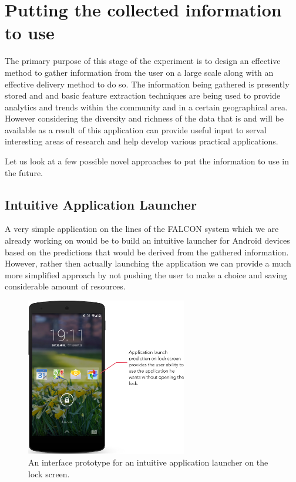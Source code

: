 \documentclass[12pt]{report}
\begin{document}
\begin{itemize}
\end{itemize}



\chapter{Putting the collected information to use}
\label{futureUser}
The primary purpose of this stage of the experiment is to design an effective method to gather information from the user on a large scale along with an effective delivery method to do so. The information being gathered is presently stored and and basic feature extraction techniques are being used to provide analytics and trends within the community and in a certain geographical area. However considering the diversity and richness of the data that is and will be available as a result of this application can provide useful input to serval interesting areas of research and help develop various practical applications.

Let us look at a few possible novel approaches to put the information to use in the future.

\section{Intuitive Application Launcher}

A very simple application on the lines of the FALCON system \cite{yan2012fast} which we are already working on would be to build an intuitive launcher for Android devices based on the predictions that would be derived from the gathered information. However, rather then actually launching the application we can provide a much more simplified approach by not pushing the user to make a choice and saving considerable amount of resources.

\begin{figure}[htbp]
 \centering
 \includegraphics[width=70mm]{IntLauncher.png}
  \caption[An interface prototype for an intuitive application launcher.]{An interface prototype for an intuitive application launcher on the lock screen.}
 \label{figure:SensorInformation}
\end{figure}
\end{document}
